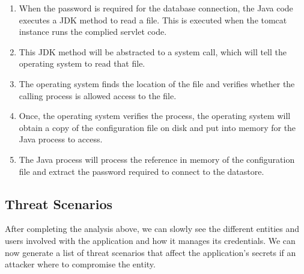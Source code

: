\documentclass[11pt, a4paper, notitlepage]{article}
\begin{document}
\begin{enumerate}
\item When the password is required for the database connection, the Java code executes a JDK method to read a file. This is executed when the tomcat instance runs the complied servlet code.
\item This JDK method will be abstracted to a system call, which will tell the operating system to read that file. 
\item The operating system finds the location of the file and verifies whether the calling process is allowed access to the file.
\item Once, the operating system verifies the process, the operating system will obtain a copy of the configuration file on disk and put into memory for the Java process to access.
\item The Java process will process the reference in memory of the configuration file and extract the password required to connect to the datastore.
\end{enumerate}


\subsection*{Threat Scenarios}
After completing the analysis above, we can slowly see the different entities and users involved with the application and how it manages its credentials. We can now generate a list of threat scenarios that affect the application's secrets if an attacker where to compromise the entity. \\
\end{document}
